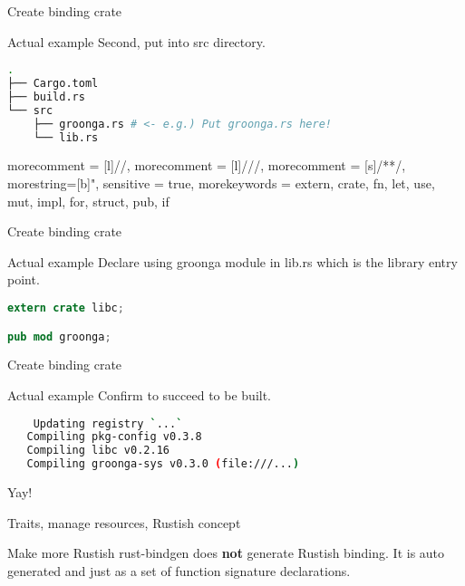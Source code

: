 \documentclass[12pt, unicode]{beamer}
\begin{document}
\begin{frame}[fragile]{Create binding crate}
\begin{block}{Actual example}
Second, put into src directory.
\end{block}
\begin{lstlisting}[language={bash},basicstyle=\ttfamily\Small]
% tree -L 2 .
.
├── Cargo.toml
├── build.rs
└── src
    ├── groonga.rs # <- e.g.) Put groonga.rs here!
    └── lib.rs
\end{lstlisting}
\end{frame}

 {
  morecomment = [l]{//},
  morecomment = [l]{///},
  morecomment = [s]{/*}{*/},
  morestring=[b]",
  sensitive = true,
  morekeywords = {extern, crate, fn, let, use, mut, impl, for, struct, pub, if}
}
\begin{frame}[fragile]{Create binding crate}
\begin{block}{Actual example}
Declare using groonga module in lib.rs which is the library entry point.
\end{block}
\begin{lstlisting}[language={Rust},basicstyle=\ttfamily\Small]
extern crate libc;

pub mod groonga;
\end{lstlisting}
\end{frame}





\begin{frame}[fragile]{Create binding crate}
\begin{block}{Actual example}
Confirm to succeed to be built.
\end{block}
\begin{lstlisting}[language={bash},basicstyle=\ttfamily\Small]
% cargo build
    Updating registry `...`
   Compiling pkg-config v0.3.8
   Compiling libc v0.2.16
   Compiling groonga-sys v0.3.0 (file:///...)
\end{lstlisting}
 {\Large Yay!}
\end{frame}

\begin{frame}{Traits, manage resources, Rustish concept}
\begin{block}{Make more Rustish}
rust-bindgen does \textbf {not} generate Rustish binding.
\newline
It is auto generated and just as a set of function signature declarations.
\end{block}
\end{frame}
\end{document}
